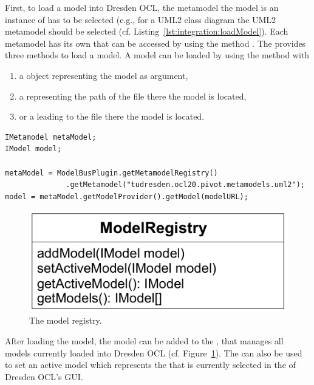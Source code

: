 First, to load a model into Dresden OCL, the metamodel the model is an instance
of has to be selected (e.g., for a \acs{UML}2 class diagram the \acs{UML}2 
metamodel should be selected (cf. Listing~\ref{lst:integration:loadModel}).
Each metamodel has its own  that can be accessed by using 
the method . The  
provides three methods to load a model. A model can be loaded by using the 
method  with

\begin{enumerate}
	\item a  object representing the model as argument,
	\item a  representing the path of the file there the model is 
	  located,
	\item or a  leading to the file there the model is located.
\end{enumerate}

\lstset{
  language=Java
}
\begin{lstlisting}[caption={How to load a model.}, captionpos=b, label=lst:integration:loadModel, float]
IMetamodel metaModel;
IModel model;

metaModel = ModelBusPlugin.getMetamodelRegistry()
              .getMetamodel("tudresden.ocl20.pivot.metamodels.uml2");
model = metaModel.getModelProvider().getModel(modelURL);
\end{lstlisting}

\begin{figure}[!b]
	\centering
	\includegraphics[width=.55\linewidth]{figures/integration/modelRegistry}
	\caption{The model registry.}
	\label{pic:integration:modelRegistry}
\end{figure}

After loading the model, the model can be added to the ,
that manages all models currently loaded into Dresden OCL (cf. 
Figure~\ref{pic:integration:modelRegistry}). The  can also 
be used to set an active model which represents the  that is 
currently selected in the  of Dresden OCL's GUI.


